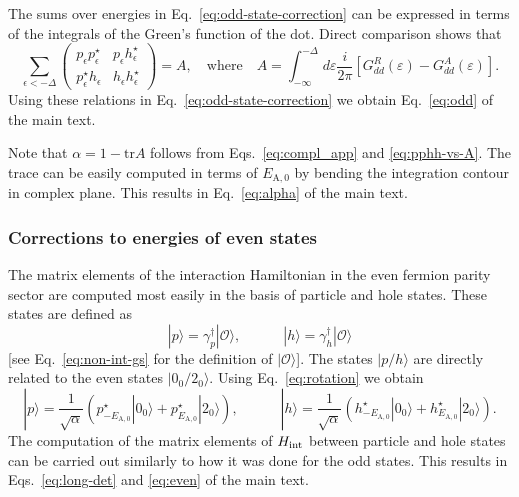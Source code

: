 \documentclass[aps,reprint,longbibliography, prb]{revtex4-2}
\begin{document}
The sums over energies in Eq.~\eqref{eq:odd-state-correction} can be expressed in terms of the integrals of the Green's function of the dot. Direct comparison shows that
\begin{equation}
\sum_{\epsilon<-\Delta}
\begin{pmatrix}
\label{eq:pphh-vs-A}
p_\epsilon p_\epsilon^\star & p_\epsilon h_\epsilon^\star\\
p_\epsilon^\star h_\epsilon & h_\epsilon h_\epsilon^\star 
\end{pmatrix} = A,\quad \text{where}\quad A = \int_{-\infty}^{-\Delta} d\varepsilon \frac{i}{2\pi}\left[G^R_{dd}(\varepsilon)-G^A_{dd}(\varepsilon)\right].
\end{equation}
Using these relations in Eq.~\eqref{eq:odd-state-correction} we obtain Eq.~\eqref{eq:odd} of the main text.

Note that $\alpha = 1 - \mathrm{tr} A$ follows from Eqs.~\eqref{eq:compl_app} and \eqref{eq:pphh-vs-A}. The trace can be easily computed in terms of $E_\mathrm{A,0}$ by bending the integration contour in complex plane. This results in Eq.~\eqref{eq:alpha} of the main text.
 
\subsubsection*{Corrections to energies of even states}
The matrix elements of the interaction Hamiltonian in the even fermion parity sector are computed most easily in the basis of particle and hole states. These states are defined as
\begin{equation}
\label{eq:p-h-states}
|p\rangle=\gamma_{p}^{\dagger}|\mathcal{O}\rangle,\quad\quad\quad|h\rangle=\gamma_{h}^{\dagger}|\mathcal{O}\rangle
\end{equation}
[see Eq.~\eqref{eq:non-int-gs} for the definition of $|\mathcal{O}\rangle$]. The states $|p/h\rangle$ are directly related to the even states $|0_0 / 2_0\rangle$. Using Eq.~\eqref{eq:rotation} we obtain
\begin{equation}\label{eq:ph_app}
    |p\rangle = \frac{1}{\sqrt{\alpha}}\left(p_{-E_\mathrm{A,0}}^\star|0_0\rangle+p_{E_\mathrm{A,0}}^\star |2_0\rangle\right),\quad\quad\quad
    |h\rangle = \frac{1}{\sqrt{\alpha}}\left(h_{-E_\mathrm{A,0}}^\star|0_0\rangle + h_{E_\mathrm{A,0}}^\star|2_0\rangle\right). 
\end{equation}
The computation of the matrix elements of $H_{\rm int}$ between particle and hole states can be carried out similarly to how it was done for the odd states. This results in Eqs.~\eqref{eq:long-det} and \eqref{eq:even} of the main text.
\end{document}
